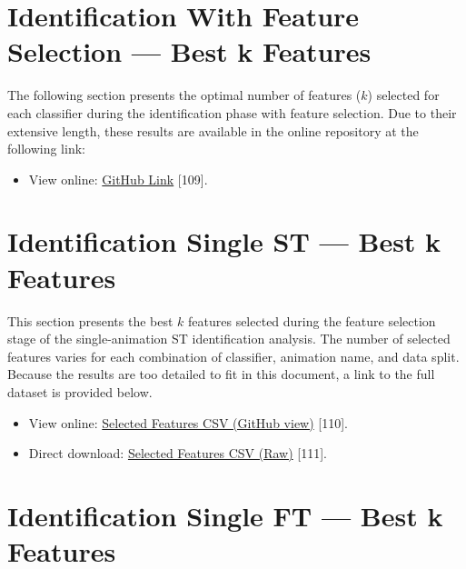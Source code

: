 \documentclass[12pt]{report}
\begin{document}
\FloatBarrier


\section{Identification With Feature Selection — Best k Features}
\label{subsec:id_fs_k}

The following section presents the optimal number of features ($k$) selected for each classifier during the identification phase with feature selection.
Due to their extensive length, these results are available in the online repository at the following link:

\begin{itemize}
    \item View online: 
    \href{https://github.com/DavideMascheroni99/movingText/tree/main/Programs/Machine_Learning/Machine_Learning_results/Identification_results/Identification_KBest/Feature}
    {GitHub Link} [109].
\end{itemize}
\FloatBarrier

\section{Identification Single ST — Best k Features}

This section presents the best $k$ features selected during the feature selection stage of the single-animation ST identification analysis.
The number of selected features varies for each combination of classifier, animation name, and data split. 
Because the results are too detailed to fit in this document, a link to the full dataset is provided below.

\begin{itemize}
    \item View online: 
    \href{https://github.com/DavideMascheroni99/movingText/blob/main/Programs/Machine_Learning/Machine_Learning_results/Identification_single_results/selected_features_st.csv}
    {Selected Features CSV (GitHub view)} [110].
    \item Direct download: 
    \href{https://github.com/DavideMascheroni99/movingText/raw/main/Programs/Machine_Learning/Machine_Learning_results/Identification_single_results/selected_features_st.csv}
    {Selected Features CSV (Raw)} [111].
\end{itemize}
\FloatBarrier

\section{Identification Single FT — Best k Features}
\label{subsec:topk_ft}
\end{document}
